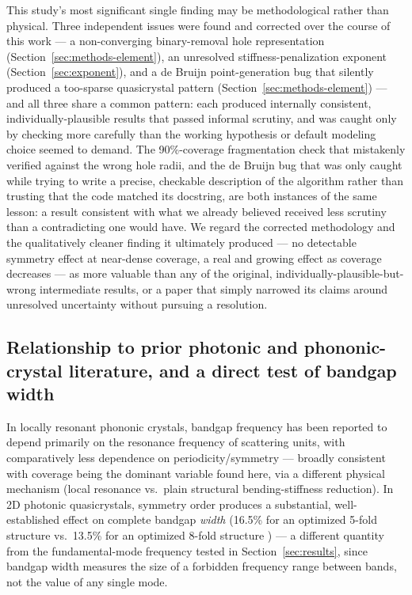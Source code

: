 \documentclass[11pt]{article}
\begin{document}
This study's most significant single finding may be methodological rather than physical. Three independent issues were found and corrected over the course of this work --- a non-converging binary-removal hole representation (Section~\ref{sec:methods-element}), an unresolved stiffness-penalization exponent (Section~\ref{sec:exponent}), and a de Bruijn point-generation bug that silently produced a too-sparse quasicrystal pattern (Section~\ref{sec:methods-element}) --- and all three share a common pattern: each produced internally consistent, individually-plausible results that passed informal scrutiny, and was caught only by checking more carefully than the working hypothesis or default modeling choice seemed to demand. The 90\%-coverage fragmentation check that mistakenly verified against the wrong hole radii, and the de Bruijn bug that was only caught while trying to write a precise, checkable description of the algorithm rather than trusting that the code matched its docstring, are both instances of the same lesson: a result consistent with what we already believed received less scrutiny than a contradicting one would have. We regard the corrected methodology and the qualitatively cleaner finding it ultimately produced --- no detectable symmetry effect at near-dense coverage, a real and growing effect as coverage decreases --- as more valuable than any of the original, individually-plausible-but-wrong intermediate results, or a paper that simply narrowed its claims around unresolved uncertainty without pursuing a resolution.

\subsection{Relationship to prior photonic and phononic-crystal literature, and a direct test of bandgap width}

In locally resonant phononic crystals, bandgap frequency has been reported to depend primarily on the resonance frequency of scattering units, with comparatively less dependence on periodicity/symmetry --- broadly consistent with coverage being the dominant variable found here, via a different physical mechanism (local resonance vs.\ plain structural bending-stiffness reduction). In 2D photonic quasicrystals, symmetry order produces a substantial, well-established effect on complete bandgap \textit{width} (16.5\% for an optimized 5-fold structure vs.\ 13.5\% for an optimized 8-fold structure \cite{florescu2009}) --- a different quantity from the fundamental-mode frequency tested in Section~\ref{sec:results}, since bandgap width measures the size of a forbidden frequency range between bands, not the value of any single mode.
\end{document}
